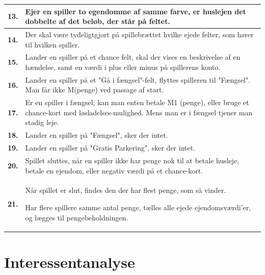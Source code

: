 \begin{tabular}{| l |p{13cm}|}
    \hline
    \textbf{13.}
    &
    Ejer en spiller to egendomme af samme farve, er huslejen det dobbelte af det beløb, der står på feltet. \\
    
    \hline
    \textbf{14.} 
    &
    Der skal være tydeligtgjort på spillebrættet hvilke ejede felter, som hører til hvilken spiller. \\
      
    \hline
    \textbf{15.}
    &
    Lander en spiller på et chance felt, skal der vises en beskrivelse af en hændelse, samt en værdi i plus eller minus på spillerens konto. \\

    \hline
    \textbf{16.}
    &
    Lander en spiller på et "Gå i fængsel"-felt, flyttes spilleren til "Fængsel". Man får ikke M(penge) ved passage af start. \\
      
    \hline
    \textbf{17.}
    &
    Er en spiller i fængsel, kan man enten betale M1 (penge), eller bruge et chance-kort med løsladelses-mulighed. Mens man er i fængsel tjener man stadig leje. \\
      
    \hline
    \textbf{18.}
    &
    Lander en spiller på "Fængsel", sker der intet. \\
      
    \hline
    \textbf{19.}
    &
    Lander en spiller på "Gratis Parkering", sker der intet. \\
      
    \hline
    \textbf{20.}
    &
    Spillet sluttes, når en spiller ikke har penge nok til at betale husleje, betale en ejendom, eller negativ værdi på et chance-kort. \\
      
    \hline
    \textbf{21.}
    &
    Når spillet er slut, findes den der har flest penge, som så vinder. 
    
    Har flere spillere samme antal penge, tælles alle ejede ejendomsværdi’er, og lægges til pengebeholdningen. \\
      
    \hline
\end{tabular}

\pagebreak

\section{Interessentanalyse}


